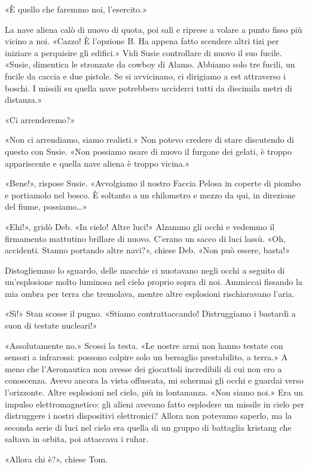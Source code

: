 «È quello che faremmo noi, l'esercito.»

La nave aliena calò di nuovo di quota, poi salì e riprese a volare a
punto fisso più vicino a noi. «Cazzo! È l'opzione B. Ha appena fatto
scendere altri tizi per iniziare a perquisire gli edifici.» Vidi Susie
controllare di nuovo il suo fucile. «Susie, dimentica le stronzate da
cowboy di Alamo. Abbiamo solo tre fucili, un fucile da caccia e due
pistole. Se si avvicinano, ci dirigiamo a est attraverso i boschi. I
missili su quella nave potrebbero ucciderci tutti da diecimila metri di
distanza.»

«Ci arrenderemo?»

«Non ci arrendiamo, siamo realisti.» Non potevo credere di stare
discutendo di questo con Susie. «Non possiamo usare di nuovo il furgone
dei gelati, è troppo appariscente e quella nave aliena è troppo vicina.»

«Bene!», rispose Susie. «Avvolgiamo il nostro Faccia Pelosa in coperte
di piombo e portiamolo nel bosco. È soltanto a un chilometro e mezzo da
qui, in direzione del fiume, possiamo\ldots»

«Ehi!», gridò Deb. «In cielo! Altre luci!» Alzammo gli occhi e vedemmo
il firmamento mattutino brillare di nuovo. C'erano un sacco di luci
lassù. «Oh, accidenti. Stanno portando altre navi?», chiese Deb. «Non
può essere, basta!»

Distogliemmo lo sguardo, delle macchie ci nuotavano negli occhi a
seguito di un'esplosione molto luminosa nel cielo proprio sopra di noi.
Ammiccai fissando la mia ombra per terra che tremolava, mentre altre
esplosioni rischiaravano l'aria.

«Sì!» Stan scosse il pugno. «Stiamo contrattaccando! Distruggiamo i
bastardi a suon di testate nucleari!»

«Assolutamente no.» Scossi la testa. «Le nostre armi non hanno testate
con sensori a infrarossi: possono colpire solo un bersaglio
prestabilito, a terra.» A meno che l'Aeronautica non avesse dei
giocattoli incredibili di cui non ero a conoscenza. Avevo ancora la
vista offuscata, mi schermai gli occhi e guardai verso l'orizzonte.
Altre esplosioni nel cielo, più in lontananza. «Non siamo noi.» Era un
impulso elettromagnetico: gli alieni avevano fatto esplodere un missile
in cielo per distruggere i nostri dispositivi elettronici? Allora non
potevamo saperlo, ma la seconda serie di luci nel cielo era quella di un
gruppo di battaglia kristang che saltava in orbita, poi attaccava i
ruhar.

«Allora chi è?», chiese Tom.

